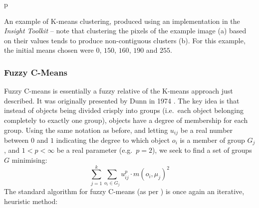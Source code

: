 \begin{stusubfig}{p}
	\hspace{4mm}%
\caption[An example of K-means clustering, produced using an implementation in the \emph{Insight Toolkit}]{An example of K-means clustering, produced using an implementation in the \emph{Insight Toolkit} -- note that clustering the pixels of the example image (a) based on their values tends to produce non-contiguous clusters (b). For this example, the initial means chosen were $0$, $150$, $160$, $190$ and $255$.}
\label{fig:background-segmentation-kmeans}
\end{stusubfig}


\subsubsection{Fuzzy C-Means}


Fuzzy C-means is essentially a fuzzy relative of the K-means approach just described. It was originally presented by Dunn in 1974 \cite{dunn74}. The key idea is that instead of objects being divided crisply into groups (i.e.~each object belonging completely to exactly one group), objects have a degree of membership for each group. Using the same notation as before, and letting $u_{ij}$ be a real number between $0$ and $1$ indicating the degree to which object $o_i$ is a member of group $G_j$, and $1 < p < \infty$ be a real parameter (e.g.~$p = 2$), we seek to find a set of groups $G$ minimising:
%
\[
\sum_{j=1}^k \sum_{o_i \in G_j} u_{ij}^p \cdot m(o_i,\mu_j)^2
\]
%
The standard algorithm for fuzzy C-means (as per \cite{matteucci}) is once again an iterative, heuristic method:

